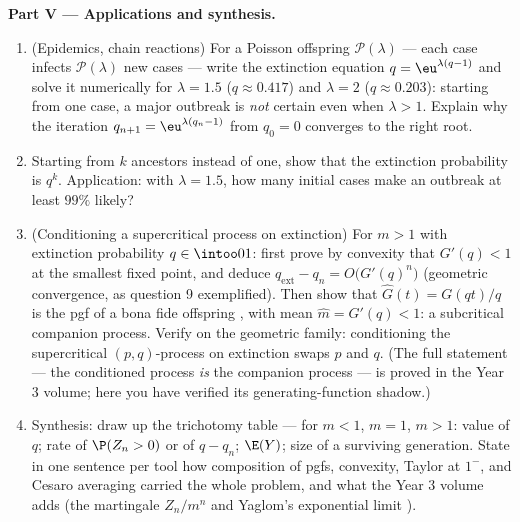 \begin{problem}
\medskip
\noindent\textbf{Part V --- Applications and synthesis.}
\begin{enumerate}[resume]
  \item (Epidemics, chain reactions) For a Poisson offspring
         $\mathcal P(\lambda)$ --- each case infects
        $\mathcal P(\lambda)$ new cases --- write the
        extinction equation $q = \eu^{\lambda(q-1)}$ and
        solve it numerically for $\lambda = 1.5$ ($q \approx
        0.417$) and $\lambda = 2$ ($q \approx 0.203$):
        starting from one case, a major outbreak is
        \emph{not} certain even when $\lambda > 1$. Explain
        why the iteration $q_{n+1} = \eu^{\lambda(q_n - 1)}$
        from $q_0 = 0$ converges to the right root.
  \item Starting from $k$ ancestors instead of one, show that
        the extinction probability is $q^k$. Application:
        with $\lambda = 1.5$, how many initial cases make an
        outbreak at least $99\%$ likely?
  \item (Conditioning a supercritical process on extinction)
        For $m > 1$ with extinction probability $q \in
        \intoo01$: first prove by convexity that $G'(q) < 1$
        at the smallest fixed point, and deduce
        $q_{\mathrm{ext}} - q_n = O\bigl(G'(q)^n\bigr)$
        (geometric convergence, as question 9 exemplified).
        Then show that $\widehat G(t) = G(qt)/q$ is the pgf
        of a bona fide offspring , with mean $\widehat m =
        G'(q) < 1$: a subcritical companion process. Verify
        on the geometric family: conditioning the
        supercritical $(p, q)$-process on extinction swaps
        $p$ and $q$. (The full statement --- the conditioned
        process \emph{is} the companion process --- is proved
        in the Year 3 volume; here you have verified its
        generating-function shadow.)
  \item Synthesis: draw up the trichotomy table --- for $m <
        1$, $m = 1$, $m > 1$: value of $q$; rate of $\P(Z_n >
        0)$ or of $q - q_n$; $\E(Y)$; size of a surviving
        generation. State in one sentence per tool how
        composition of pgfs, convexity, Taylor at $1^-$, and
        Cesaro averaging carried the whole problem, and what
        the Year 3 volume adds (the martingale $Z_n/m^n$ and
        Yaglom's exponential limit ).
\end{enumerate}
\end{problem}
